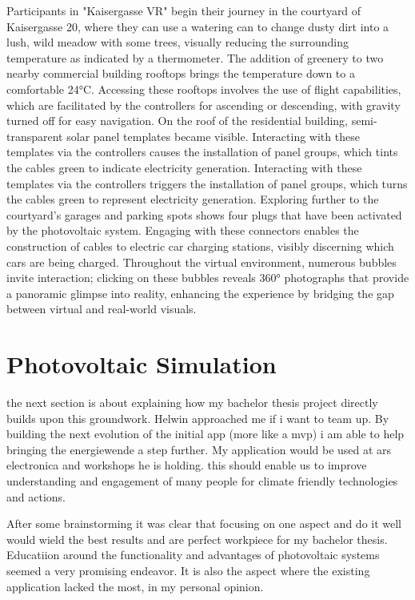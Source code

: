 \documentclass[draft, final]{vutinfth} %
\begin{document}
Participants in "Kaisergasse VR" begin their journey in the courtyard of Kaisergasse 20, where they can use a watering can to change dusty dirt into a lush, wild meadow with some trees, visually reducing the surrounding temperature as indicated by a thermometer. The addition of greenery to two nearby commercial building rooftops brings the temperature down to a comfortable 24°C. Accessing these rooftops involves the use of flight capabilities, which are facilitated by the controllers for ascending or descending, with gravity turned off for easy navigation. On the roof of the residential building, semi-transparent solar panel templates became visible. Interacting with these templates via the controllers causes the installation of panel groups, which tints the cables green to indicate electricity generation.
Interacting with these templates via the controllers triggers the installation of panel groups, which turns the cables green to represent electricity generation. Exploring further to the courtyard's garages and parking spots shows four plugs that have been activated by the photovoltaic system. Engaging with these connectors enables the construction of cables to electric car charging stations, visibly discerning which cars are being charged.
Throughout the virtual environment, numerous bubbles invite interaction; clicking on these bubbles reveals 360° photographs that provide a panoramic glimpse into reality, enhancing the experience by bridging the gap between virtual and real-world visuals.

\section{Photovoltaic Simulation}
the next section is about explaining how my bachelor thesis project directly builds upon this groundwork. Helwin approached me  if i want to team up. By building the next evolution of the initial app (more like a mvp) i am able to help bringing the energiewende a step further. My application would  be used at ars electronica and workshops he is holding. this should enable us to improve understanding and engagement of many people for climate friendly technologies and actions. 

After some brainstorming it was clear that focusing on one aspect and do it well would wield the best results and are perfect workpiece for my bachelor thesis. Educatiion around the functionality and advantages of photovoltaic systems seemed a very promising endeavor. It is also the aspect where the existing application lacked the most, in my personal opinion.
\end{document}
